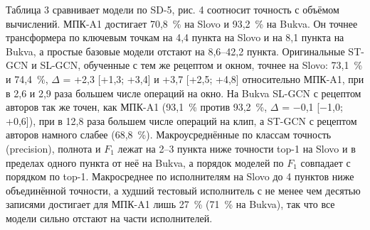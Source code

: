 \documentclass[a4paper,fleqn]{cas-dc}
\begin{document}
Таблица 3 сравнивает модели по SD-5, рис. 4 соотносит точность с объёмом вычислений. МПК-A1 достигает 70,8~\% на Slovo и 93,2~\% на Bukva. Он точнее трансформера по ключевым точкам на 4,4 пункта на Slovo и на 8,1 пункта на Bukva, а простые базовые модели отстают на 8,6--42,2 пункта. Оригинальные ST-GCN и SL-GCN, обученные с тем же рецептом и окном, точнее на Slovo: 73,1~\% и 74,4~\%, \(\Delta\) = +2,3 {[}+1,3; +3,4{]} и +3,7 {[}+2,5; +4,8{]} относительно МПК-A1, при в 2,6 и 2,9 раза большем числе операций на окно. На Bukva SL-GCN с рецептом авторов так же точен, как МПК-A1 (93,1~\% против 93,2~\%, \(\Delta\) = $-$0,1 {[}$-$1,0; +0,6{]}), при в 12,8 раза большем числе операций на клип, а ST-GCN с рецептом авторов намного слабее (68,8~\%). Макроусреднённые по классам точность (precision), полнота и \(F_1\) лежат на 2--3 пункта ниже точности top-1 на Slovo и в пределах одного пункта от неё на Bukva, а порядок моделей по \(F_1\) совпадает с порядком по top-1. Макросреднее по исполнителям на Slovo до 4 пунктов ниже объединённой точности, а худший тестовый исполнитель с не менее чем десятью записями достигает для МПК-A1 лишь 27~\% (71~\% на Bukva), так что все модели сильно отстают на части исполнителей.
\end{document}
